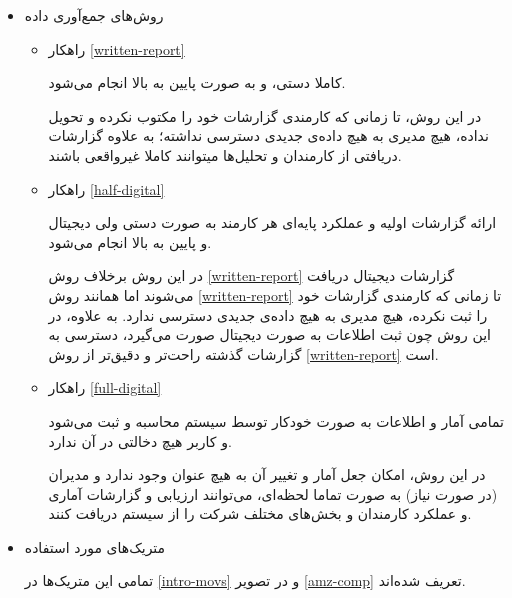 \documentclass[12pt]{article}
\begin{document}
\begin{itemize}
\item         
روش‌های جمع‌آوری داده
\begin{itemize}
    \item راهکار \ref{written-report} 
    
    کاملا دستی، و به صورت پایین به بالا انجام می‌شود.
  
  در این روش، تا زمانی که کارمندی گزارشات خود را مکتوب نکرده و تحویل نداده، هیچ مدیری به هیچ داده‌ی جدیدی دسترسی نداشته؛ به علاوه گزارشات دریافتی از کارمندان و تحلیل‌ها میتوانند کاملا غیرواقعی‌ باشند.
    \item راهکار \ref{half-digital}
    
    ارائه گزارشات اولیه و عملکرد پایه‌ای هر کارمند به صورت دستی ولی دیجیتال و پایین به بالا انجام می‌شود.
    
    در این روش برخلاف روش \ref{written-report} گزارشات دیجیتال دریافت می‌شوند اما همانند روش \ref{written-report} تا زمانی که کارمندی گزارشات خود را ثبت نکرده، هیچ مدیری به هیچ داده‌ی جدیدی دسترسی ندارد. به علاوه، در این روش چون ثبت اطلاعات به صورت دیجیتال صورت می‌گیرد، دسترسی به گزارشات گذشته راحت‌تر و دقیق‌تر از روش \ref{written-report} است.
    
    \item راهکار \ref{full-digital}
    
    تمامی آمار و اطلاعات به صورت خودکار توسط سیستم محاسبه و ثبت می‌شود و کاربر هیچ دخالتی در آن ندارد.
    
    در این روش، امکان جعل آمار و تغییر آن به هیچ عنوان وجود ندارد و مدیران (در صورت نیاز) به صورت تماما لحظه‌ای، می‌توانند ارزیابی و گزارشات آماری و عملکرد کارمندان و بخش‌های مختلف شرکت را از سیستم دریافت کنند.
\end{itemize}
\item         
متریک‌های مورد استفاده

تمامی این متریک‌ها در \ref{intro-movs} و در تصویر \ref{amz-comp} تعریف شده‌اند.


\end{itemize}
\end{document}
